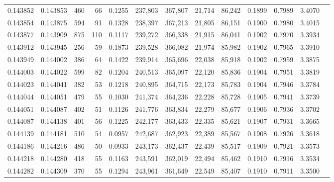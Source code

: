 \begin{tabular}{rrrrrrrrrrrrr}
0.143852 & 0.143853 &   460 &  66 &                                     0.1255 & 237,803 & 367,807 &  21,714 &  86,242 & 0.1899 & 0.7989 & 3.4070 \\
0.143854 & 0.143875 &   594 &  91 &                                     0.1328 & 238,397 & 367,213 &  21,805 &  86,151 & 0.1900 & 0.7980 & 3.4015 \\
0.143877 & 0.143909 &   875 & 110 &                                     0.1117 & 239,272 & 366,338 &  21,915 &  86,041 & 0.1902 & 0.7970 & 3.3934 \\
0.143912 & 0.143945 &   256 &  59 &                                     0.1873 & 239,528 & 366,082 &  21,974 &  85,982 & 0.1902 & 0.7965 & 3.3910 \\
0.143949 & 0.144002 &   386 &  64 &                                     0.1422 & 239,914 & 365,696 &  22,038 &  85,918 & 0.1902 & 0.7959 & 3.3875 \\
0.144003 & 0.144022 &   599 &  82 &                                     0.1204 & 240,513 & 365,097 &  22,120 &  85,836 & 0.1904 & 0.7951 & 3.3819 \\
0.144023 & 0.144041 &   382 &  53 &                                     0.1218 & 240,895 & 364,715 &  22,173 &  85,783 & 0.1904 & 0.7946 & 3.3784 \\
0.144044 & 0.144051 &   479 &  55 &                                     0.1030 & 241,374 & 364,236 &  22,228 &  85,728 & 0.1905 & 0.7941 & 3.3739 \\
0.144051 & 0.144087 &   402 &  51 &                                     0.1126 & 241,776 & 363,834 &  22,279 &  85,677 & 0.1906 & 0.7936 & 3.3702 \\
0.144087 & 0.144138 &   401 &  56 &                                     0.1225 & 242,177 & 363,433 &  22,335 &  85,621 & 0.1907 & 0.7931 & 3.3665 \\
0.144139 & 0.144181 &   510 &  54 &                                     0.0957 & 242,687 & 362,923 &  22,389 &  85,567 & 0.1908 & 0.7926 & 3.3618 \\
0.144186 & 0.144216 &   486 &  50 &                                     0.0933 & 243,173 & 362,437 &  22,439 &  85,517 & 0.1909 & 0.7921 & 3.3573 \\
0.144218 & 0.144280 &   418 &  55 &                                     0.1163 & 243,591 & 362,019 &  22,494 &  85,462 & 0.1910 & 0.7916 & 3.3534 \\
0.144282 & 0.144309 &   370 &  55 &                                     0.1294 & 243,961 & 361,649 &  22,549 &  85,407 & 0.1910 & 0.7911 & 3.3500 \\

\end{tabular}
